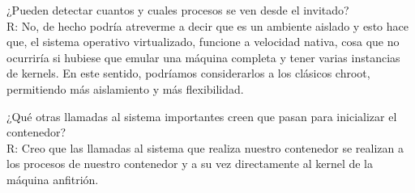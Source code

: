 \documentclass[1pt]{article} %
\begin{document}
¿Pueden detectar cuantos y cuales procesos se ven desde el invitado?\\

R: No, de hecho podría atreverme a decir que es un ambiente aislado y esto hace que, el sistema operativo virtualizado, funcione a velocidad nativa, cosa que no ocurriría si hubiese que emular una máquina completa y tener varias instancias de kernels. En este sentido, podríamos considerarlos a los clásicos chroot, permitiendo más aislamiento y más flexibilidad.

¿Qué otras llamadas al sistema importantes creen que pasan para inicializar el contenedor?\\

R: Creo que las llamadas al sistema que realiza nuestro contenedor se realizan a los procesos de nuestro contenedor y a su vez directamente al kernel de la máquina anfitrión.
\end{document}
